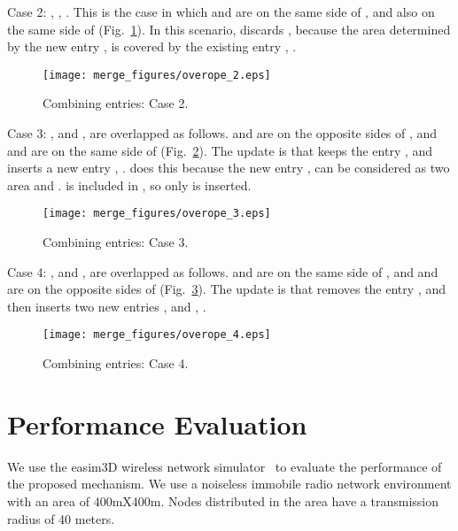 \documentclass[3p,times]{elsarticle}
\begin{document}
Case 2:  ,     ,  .
This is the case in which  and  are on the same side of ,
and also on the same side of  (Fig.~\ref{fig3_12}).
In this scenario,  discards  ,   because the area determined by the new entry  ,  
is covered by the existing entry  ,  .

\begin{figure}[!htp]
\begin{center}
\texttt{[image: merge\_figures/overope\_2.eps]}
\end{center}
\caption{Combining entries: Case 2.}
\label{fig3_12}
\end{figure}


Case 3:  ,   and  ,   are overlapped as follows.  and  are on the opposite sides of ,
and  and  are on the same side of  (Fig.~\ref{fig3_13}).
The update is that
 keeps the entry  ,   and inserts a new entry  ,  .  does this because
the new entry  ,   can be considered as two area  and .  is included in ,
so only  is inserted.


\begin{figure}[!htp]
\begin{center}
\texttt{[image: merge\_figures/overope\_3.eps]}
\end{center}
\caption{Combining entries: Case 3.}
\label{fig3_13}
\end{figure}



Case 4:  ,   and  ,   are overlapped as follows.  and  are on the
same side of ,
and  and  are on the opposite sides of  (Fig.~\ref{fig3_14}).
The update is that
 removes the entry  ,   and then inserts two new entries  ,   and  ,  .

\begin{figure}[!htp]
\begin{center}
\texttt{[image: merge\_figures/overope\_4.eps]}
\end{center}
\caption{Combining entries: Case 4.}
\label{fig3_14}
\end{figure}




\section{Performance Evaluation}
\label{evaluation}




We use the easim3D wireless network simulator~\cite{ex27} to evaluate the performance of the proposed mechanism.
We use a noiseless immobile radio network environment with an area of 400mX400m.
Nodes distributed in the area have a transmission radius of 40 meters.
\end{document}
